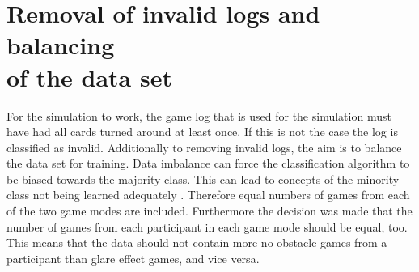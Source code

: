 
\section{Removal of invalid logs and balancing \\of the data set}
\label{removal_of_invalid_logs}
For the simulation to work, the game log that is used for the simulation must have had all cards turned around at least once. If this is not the case the log is classified as invalid. Additionally to removing invalid logs, the aim is to balance the data set for training. Data imbalance can force the classification algorithm to be biased towards the majority class. This can lead to concepts of the minority class not being learned adequately \cite{imbalance}. Therefore equal numbers of games from each of the two game modes are included. Furthermore the decision was made that the number of games from each participant in each game mode should be equal, too. This means that the data should not contain more no obstacle games from a participant than glare effect games, and vice versa.

